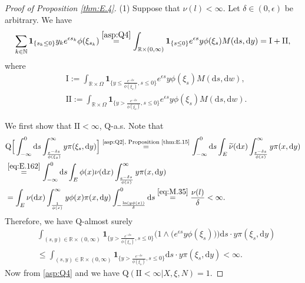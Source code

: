 \documentclass[12pt,a4paper]{amsart}
\numberwithin{equation}{section}
\theoremstyle{plain}
\theoremstyle{definition}
\theoremstyle{remark}
\begin{document}
\begin{proof}[Proof of Proposition \ref{thm:E.4}]
	(1) Suppose that $\nu(l)<\infty$.
Let $\delta\in (0,\epsilon)$ be arbitrary.
	We have
\begin{align}
	\sum_{k\in \mathbb N} \mathbf 1_{\{s_k \leq 0\}} y_k e^{\epsilon s_k} \phi(\xi_{s_k})
	\overset{\eqref{asp:Q4}}=\int_{\mathbb R\times (0,\infty)} \mathbf 1_{\{s\leq 0\}} e^{\epsilon s}y\phi(\xi_{s}) M(\mathrm ds,\mathrm dy)
	= \text{I}+\text{II},
\end{align}
	where
\begin{align}
	&\text{I}
	:=\int_{\mathbb R\times \Omega} \mathbf 1_{\{y\leq \frac{e^{-\delta s}}{\phi(\xi_{s})},s\leq 0\}}e^{\epsilon s}y\phi(\xi_{s}) M(\mathrm ds,\mathrm dw),
	\\ & \text{II}
	:= \int_{\mathbb R\times \Omega} \mathbf 1_{\{y> \frac{e^{-\delta s}}{\phi(\xi_{s})},s\leq 0\}}e^{\epsilon s}y\phi(\xi_{s}) M(\mathrm ds,\mathrm dw).
\end{align}

We first show that $\text{II}< \infty$, $\mathrm Q$-a.s.
	Note that
\begin{align}
	&\mathrm Q\Big[\int_{-\infty}^0  \mathrm ds \int_{\frac{e^{-\delta s}}{\phi(\xi_{s})}}^\infty y \pi(\xi_s, \mathrm dy) \Big]
	\overset{\text{\eqref{asp:Q2}, Proposition \ref{thm:E.15}}}=\int_{-\infty}^0 \mathrm ds \int_E \widetilde \nu(\mathrm dx)\int_{\frac{e^{-\delta s}}{\phi(x)}}^\infty y\pi(x, \mathrm dy)
	\\&\overset{\eqref{eq:E.162}}=\int_{-\infty}^0 \mathrm ds \int_E \phi(x) \nu(\mathrm dx)\int_{\frac{e^{-\delta s}}{\phi(x)}}^\infty y\pi(x, \mathrm dy)
	\\&= \int_E\nu(\mathrm dx)\int_{\frac{1}{\phi(x)}}^\infty y\phi(x) \pi(x, \mathrm dy)\int_{-\frac{\ln (y\phi(x))}{\delta}}^{0}\mathrm ds
	\overset{\eqref{eq:M.35}}=\frac{\nu(l)}{\delta}
	<\infty.
\end{align}
	Therefore, we have $\mathrm Q$-almost surely
\begin{align}
&\int_{(s,y)\in \mathbb R\times (0,\infty)} \mathbf 1_{\{y> \frac{e^{-\delta s}}{\phi(\xi_{s})},s\leq 0\}} \Big(1\wedge \big(e^{\epsilon s}y\phi(\xi_{s})\big)\Big) \mathrm ds \cdot y \pi(\xi_s, \mathrm dy)
	\\&\leq   \int_{(s,y)\in \mathbb R\times (0,\infty)}  \mathbf 1_{\{y> \frac{e^{-\delta s}}{\phi(\xi_{s})},s\leq 0\}} \mathrm ds\cdot y \pi(\xi_s, \mathrm dy)
	< \infty.
\end{align}
	Now from \eqref{asp:Q4} and \cite[Theorem 2.7(i)]{Kyprianou2014Fluctuations} we have $\mathrm Q(\text{II} < \infty | X, \xi, N) = 1$.


\end{proof}
\end{document}
